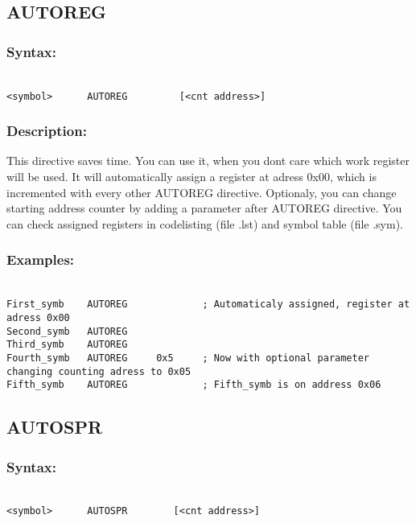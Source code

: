     \subsection{AUTOREG}
        \subsubsection{Syntax:}
            {
                ~\\
                \usecodefont        
            \verb'<symbol>      AUTOREG         [<cnt address>]'
            }            
        \subsubsection{Description:}
        This directive saves time. You can use it, when you dont care which work register will be used. It will automatically assign a register
        at adress 0x00, which is incremented with every other AUTOREG directive. Optionaly, you can change starting address counter by adding a parameter
        after AUTOREG directive. You can check assigned registers in codelisting (file .lst) and symbol table (file .sym).

        \subsubsection{Examples:}
            {
                ~\\
                \usecodefont
                \verb'First_symb    AUTOREG             ; Automaticaly assigned, register at adress 0x00'\\
                \verb'Second_symb   AUTOREG'\\
                \verb'Third_symb    AUTOREG'\\
                \verb'Fourth_symb   AUTOREG     0x5     ; Now with optional parameter changing counting adress to 0x05'\\
                \verb'Fifth_symb    AUTOREG             ; Fifth_symb is on address 0x06'\\
            }
            
    \subsection{AUTOSPR}
        \subsubsection{Syntax:}
        {
            ~\\
            \usecodefont        
            \verb'<symbol>      AUTOSPR        [<cnt address>]'
        }
           
